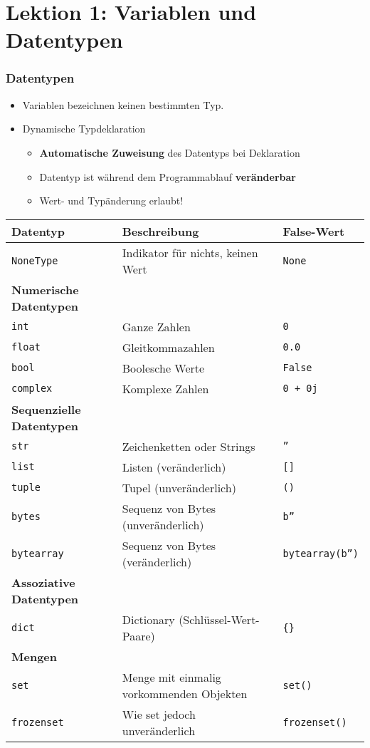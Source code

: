 \part*{Lektion 1: Variablen und Datentypen}
\section{Datentypen}
\begin{itemize}
	\item Variablen bezeichnen keinen bestimmten Typ.
	\item Dynamische Typdeklaration
	\begin{itemize}
		\item \textbf{Automatische Zuweisung} des Datentyps bei Deklaration
		\item Datentyp ist während dem Programmablauf \textbf{veränderbar}
		\item Wert- und Typänderung erlaubt!
	\end{itemize}
\end{itemize}
\begin{tabular}{|l|l|l|}
	\hline 
	\textbf{Datentyp} &\textbf{Beschreibung} &\textbf{False-Wert}\\
	\hline
	\texttt{NoneType} &Indikator für nichts, keinen Wert &\texttt{None}\\ 
	\hline
	\textbf{Numerische Datentypen}&&\\
	\texttt{int} &Ganze Zahlen &\texttt{0}\\ 
	\texttt{float} &Gleitkommazahlen &\texttt{0.0}\\ 
	\texttt{bool} &Boolesche Werte &\texttt{False}\\ 
	\texttt{complex} &Komplexe Zahlen &\texttt{0 + 0j}\\ 
	\hline 
	\textbf{Sequenzielle Datentypen}&&\\
	\texttt{str} &Zeichenketten oder Strings &\texttt{''}\\
	\texttt{list} &Listen (veränderlich) &\texttt{[]}\\
	\texttt{tuple} &Tupel (unveränderlich) &\texttt{()}\\
	\texttt{bytes} &Sequenz von Bytes (unveränderlich) &\texttt{b''}\\
	\texttt{bytearray} &Sequenz von Bytes (veränderlich) &\texttt{bytearray(b'')}\\
	\hline
	\textbf{Assoziative Datentypen}&&\\
	\texttt{dict} &Dictionary (Schlüssel-Wert-Paare) &\texttt{\{\}}\\
	\hline
	\textbf{Mengen}&&\\
	\texttt{set} &Menge mit einmalig vorkommenden Objekten &\texttt{set()}\\
	\texttt{frozenset} &Wie set jedoch unveränderlich &\texttt{frozenset()}\\
	\hline
\end{tabular}\\
